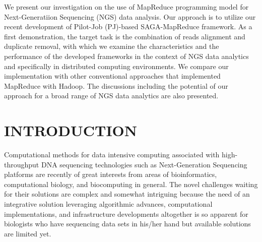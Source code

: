 \documentclass{sig-alternate}
\begin{document}
\maketitle
\begin{abstract} 



 
\end{abstract}
We present our investigation on the use of MapReduce programming model for Next-Generatiion Sequencing (NGS) data analysis.  Our approach is to utilize our recent development of Pilot-Job (PJ)-based SAGA-MapReduce framework. As a first demonstration, the target task is the combination of reads alignment and duplicate removal, with which we examine the characteristics and the performance of the developed frameworks in the context of NGS data analytics and specifically in distributed computing environments.   We compare our implementation with other conventional approaches that implemented MapReduce with Hadoop.  The discussions including the potential of our approach for a broad range of NGS data analytics are also presented. 



 






\section{INTRODUCTION} 
Computational methods for data intensive computing associated with high-throughput DNA sequencing technologies such as Next-Generation Sequencing platforms are recently of great interests from areas of bioinformatics, computational biology, and biocomputing in general.  The novel challenges waiting for their solutions are complex and somewhat intriguing because the need of an integrative solution leveraging algorithmic advances, computational implementations, and infrastructure developments altogether is so apparent for biologists who have sequencing data sets in his/her hand but available solutions are limited yet.  
\end{document}
